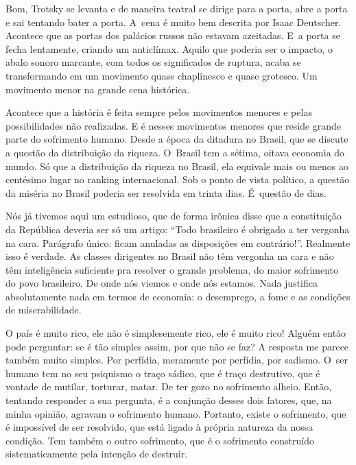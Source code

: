  

Bom, Trotsky se levanta e de maneira teatral se dirige para a porta,
abre a porta e sai tentando bater a porta. A~cena é muito bem descrita
por Isaac Deutscher. Acontece que as portas dos palácios russos não
estavam azeitadas. E~a porta se fecha lentamente, criando um anticlímax.
Aquilo que poderia ser o impacto, o abalo sonoro marcante, com todos os
significados de ruptura, acaba se transformando em um movimento quase
chaplinesco e quase grotesco. Um movimento menor na grande cena
histórica.

 

Acontece que a história é feita sempre pelos movimentos menores e pelas
possibilidades não realizadas. E é nesses movimentos menores que reside
grande parte do sofrimento humano. Desde a época da ditadura no Brasil,
que se discute a questão da distribuição da riqueza. O~Brasil tem a
sétima, oitava economia do mundo. Só que a distribuição da riqueza no
Brasil, ela equivale mais ou menos ao centésimo lugar no ranking
internacional. Sob o ponto de vista político, a questão da miséria no
Brasil poderia ser resolvida em trinta dias. É~questão de dias.

 

Nós já tivemos aqui um estudioso, que de forma irônica disse que a
constituição da República deveria ser só um artigo: ``Todo brasileiro é
obrigado a ter vergonha na cara. Parágrafo único: ficam anuladas as
disposições em contrário!''. Realmente isso é verdade. As classes
dirigentes no Brasil não têm vergonha na cara e não têm inteligência
suficiente pra resolver o grande problema, do maior sofrimento do povo
brasileiro. De onde nós viemos e onde nós estamos. Nada justifica
absolutamente nada em termos de economia: o desemprego, a fome e as
condições de miserabilidade.

 

O país é muito rico, ele não é simplesemente rico, ele é muito rico! Alguém então pode
perguntar: se é tão simples assim, por que não se faz? A resposta me
parece também muito simples. Por perfídia, meramente por perfídia, por
sadismo. O~ser humano tem no seu psiquismo o traço sádico, que é traço
destrutivo, que é vontade de mutilar, torturar, matar. De ter gozo no
sofrimento alheio. Então, tentando responder a sua pergunta, é a
conjunção desses dois fatores, que, na minha opinião, agravam o sofrimento
humano. Portanto, existe o sofrimento, que é impossível de ser resolvido,
que está ligado à própria natureza da nossa condição. Tem também o outro
sofrimento, que é o sofrimento construído sistematicamente pela intenção
de destruir.

